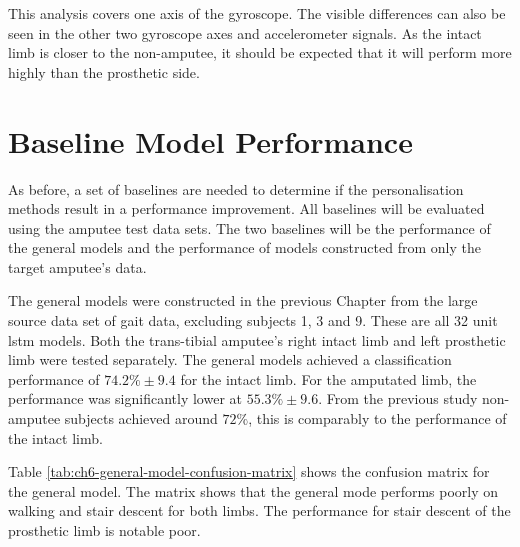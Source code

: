 This analysis covers one axis of the gyroscope. The visible differences can also be seen in the other two gyroscope axes and accelerometer signals. As the intact limb is closer to the non-amputee, it should be expected that it will perform more highly than the prosthetic side.

\section{Baseline Model Performance}
\label{sec:amputee-baseline}
As before, a set of baselines are needed to determine if the personalisation methods result in a performance improvement. All baselines will be evaluated using the amputee test data sets. The two baselines will be the performance of the general models and the performance of models constructed from only the target amputee's data.

The general models were constructed in the previous Chapter from the large source data set of gait data, excluding subjects 1, 3 and 9. These are all 32 unit \acrshort{lstm} models. Both the trans-tibial amputee's right intact limb and left prosthetic limb were tested separately. The general models achieved a classification performance of $74.2\%\pm9.4$ for the intact limb. For the amputated limb, the performance was significantly lower at $55.3\%\pm9.6$. From the previous study non-amputee subjects achieved around $72\%$, this is comparably to the performance of the intact limb.

Table \ref{tab:ch6-general-model-confusion-matrix} shows the confusion matrix for the general model. The matrix shows that the general mode performs poorly on walking and stair descent for both limbs. The performance for stair descent of the prosthetic limb is notable poor.

